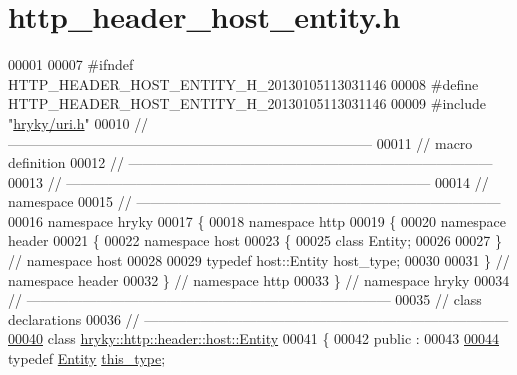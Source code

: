 \hypertarget{http__header__host__entity_8h_source}{\section{http\-\_\-header\-\_\-host\-\_\-entity.\-h}
}

\begin{DoxyCode}
00001 
00007 \textcolor{preprocessor}{#ifndef HTTP\_HEADER\_HOST\_ENTITY\_H\_20130105113031146}
00008 \textcolor{preprocessor}{}\textcolor{preprocessor}{#define HTTP\_HEADER\_HOST\_ENTITY\_H\_20130105113031146}
00009 \textcolor{preprocessor}{}\textcolor{preprocessor}{#include "\hyperlink{uri_8h}{hryky/uri.h}"}
00010 \textcolor{comment}{//
      ------------------------------------------------------------------------------}
00011 \textcolor{comment}{// macro definition}
00012 \textcolor{comment}{//
      ------------------------------------------------------------------------------}
00013 \textcolor{comment}{//
      ------------------------------------------------------------------------------}
00014 \textcolor{comment}{// namespace}
00015 \textcolor{comment}{//
      ------------------------------------------------------------------------------}
00016 \textcolor{keyword}{namespace }hryky
00017 \{
00018 \textcolor{keyword}{namespace }http
00019 \{
00020 \textcolor{keyword}{namespace }header
00021 \{
00022 \textcolor{keyword}{namespace }host
00023 \{
00025     \textcolor{keyword}{class }Entity;
00026 
00027 \} \textcolor{comment}{// namespace host}
00028 
00029 \textcolor{keyword}{typedef} host::Entity host\_type;
00030 
00031 \} \textcolor{comment}{// namespace header}
00032 \} \textcolor{comment}{// namespace http}
00033 \} \textcolor{comment}{// namespace hryky}
00034 \textcolor{comment}{//
      ------------------------------------------------------------------------------}
00035 \textcolor{comment}{// class declarations}
00036 \textcolor{comment}{//
      ------------------------------------------------------------------------------}
\hypertarget{http__header__host__entity_8h_source_l00040}{}\hyperlink{classhryky_1_1http_1_1header_1_1host_1_1_entity}{00040} \textcolor{comment}{}\textcolor{keyword}{class }\hyperlink{classhryky_1_1http_1_1header_1_1host_1_1_entity}{hryky::http::header::host::Entity}
00041 \{
00042 \textcolor{keyword}{public} :
00043 
\hypertarget{http__header__host__entity_8h_source_l00044}{}\hyperlink{classhryky_1_1http_1_1header_1_1host_1_1_entity_a28617ab18ca61481399d29706081946f}{00044}     \textcolor{keyword}{typedef} \hyperlink{classhryky_1_1http_1_1header_1_1host_1_1_entity}{Entity} \hyperlink{classhryky_1_1http_1_1header_1_1host_1_1_entity_a28617ab18ca61481399d29706081946f}{this_type};

\end{DoxyCode}
